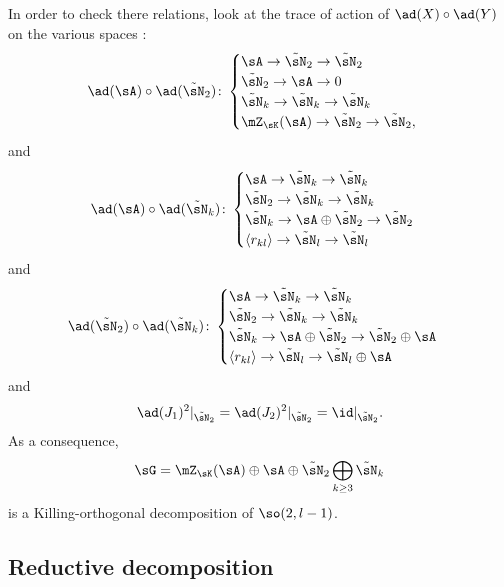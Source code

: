 In order to check there relations, look at the trace of action of $\ad(X)\circ\ad(Y)$ on the various spaces :
\begin{equation}
	\ad(\sA)\circ\ad(\tilde\sN_2) \colon 
	\begin{cases}
		\sA\to\tilde\sN_2\to\tilde\sN_2\\
		\tilde\sN_2\to\sA\to 0\\
		\tilde\sN_k\to\tilde\sN_k\to\tilde\sN_k\\
		\mZ_{\sK}(\sA)\to\tilde\sN_2\to\tilde\sN_2,
	\end{cases}
\end{equation}
and
\begin{equation}
	\ad(\sA)\circ\ad(\tilde\sN_k)\colon
	\begin{cases}
		\sA\to\tilde\sN_k\to\tilde\sN_k\\
		\tilde\sN_2\to\tilde\sN_k\to\tilde\sN_k\\
		\tilde\sN_k\to\sA\oplus\tilde\sN_2\to\tilde\sN_2\\
		\langle r_{kl}\rangle\to\tilde\sN_l\to\tilde\sN_l
	\end{cases}
\end{equation}
and
\begin{equation}
	\ad(\tilde\sN_2)\circ\ad(\tilde\sN_k)\colon
	\begin{cases}
		\sA\to\tilde\sN_k\to\tilde\sN_k\\
		\tilde\sN_2\to\tilde\sN_k\to\tilde\sN_k\\
		\tilde\sN_k\to\sA\oplus\tilde\sN_2\to\tilde\sN_2\oplus\sA\\
		\langle r_{kl}\rangle\to\tilde\sN_l\to\tilde\sN_l\oplus\sA
	\end{cases}
\end{equation}
and
\begin{equation}
	\ad(J_1)^2|_{\tilde\sN_2}=\ad(J_2)^2|_{\tilde\sN_2}=\id|_{\tilde\sN_2}.
\end{equation}
%
As a consequence,
\begin{equation}		\label{LONGEqDecompGPourKillOrtho}
	\sG=\mZ_{\sK}(\sA)\oplus\sA\oplus\tilde\sN_2\bigoplus_{k\geq 3}\tilde\sN_k
\end{equation}
is a Killing-orthogonal decomposition of $\so(2,l-1)$.

%
\subsection{Reductive decomposition}
%
\label{LONGSubSecReductiveDecompQ}

